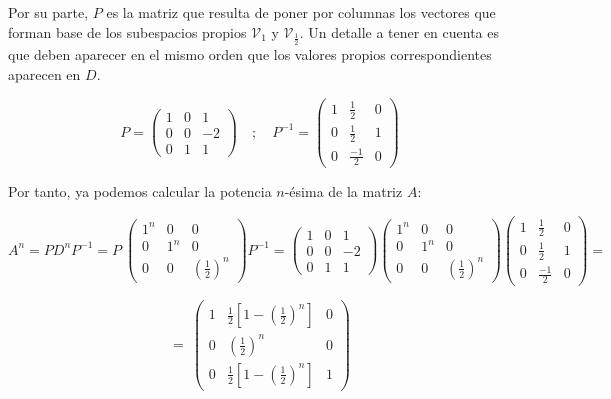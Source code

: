 \documentclass[11pt, a4paper]{article}
\newif\IfInSansMode
\numberwithin{equation}{section}
\theoremstyle{theorem-style}
\theoremstyle{definition-style}
\theoremstyle{remark-style}
\theoremstyle{example-style}
\newenvironment{nlist}
{\begin{enumerate}
    \renewcommand\labelenumi{(\emph{\roman{enumi})}}}
  {\end{enumerate}}
\begin{document}
\begin{nlist}
Por su parte, $P$ es la matriz que resulta de poner por columnas los vectores que forman base de los subespacios propios $\mathcal V_1$ y $\mathcal V_{\frac{1}{2}}$. Un detalle a tener en cuenta es que deben aparecer en el mismo orden que los valores propios correspondientes aparecen en $D$.

$$P =
\begin{pmatrix}
  1 & 0 & 1 \\
  0 & 0 & -2 \\
  0 & 1 & 1
\end{pmatrix} \quad ; \quad P^{-1} =
\begin{pmatrix}
  1 & \frac{1}{2} & 0 \\
  0 & \frac{1}{2} & 1 \\
  0 & \frac{-1}{2} & 0
\end{pmatrix}$$
\end{nlist}

Por tanto, ya podemos calcular la potencia $n$-ésima de la matriz $A$:

$$A^n = PD^nP^{-1} = P \
\begin{pmatrix}
  1^n & 0 & 0 \\
  0 & 1^n & 0 \\
  0 & 0 & \left(\frac{1}{2}\right)^n
\end{pmatrix} P^{-1} =
\begin{pmatrix}
  1 & 0 & 1 \\
  0 & 0 & -2 \\
  0 & 1 & 1
\end{pmatrix} \begin{pmatrix}
  1^n & 0 & 0 \\
  0 & 1^n & 0 \\
  0 & 0 & \left(\frac{1}{2}\right)^n
\end{pmatrix} \begin{pmatrix}
  1 & \frac{1}{2} & 0 \\
  0 & \frac{1}{2} & 1 \\
  0 & \frac{-1}{2} & 0
\end{pmatrix} = $$

$$= \
\begin{pmatrix}
  1 & \frac{1}{2} \left[1 -\left(\frac{1}{2}\right)^n \right] & 0 \\
  0 & \left( \frac{1}{2} \right)^n & 0 \\
  0 & \frac{1}{2} \left[1 -\left(\frac{1}{2}\right)^n \right] & 1
\end{pmatrix}$$
\end{document}

